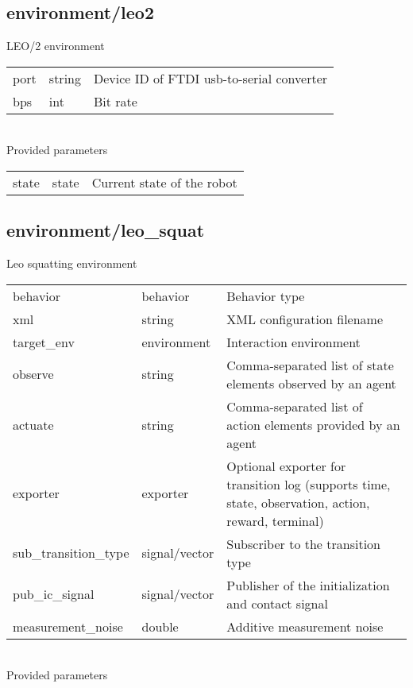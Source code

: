\subsection{environment/leo2}
\noindent LEO/2 environment\\

\noindent\begin{tabular}{@{}lll@{}}
port&string&Device ID of FTDI usb-to-serial converter\\
bps&int&Bit rate\\
\end{tabular}
\\

\noindent Provided parameters\\

\noindent\begin{tabular}{@{}lll@{}}
state&state&Current state of the robot\\
\end{tabular}
\subsection{environment/leo\_squat}
\noindent Leo squatting environment\\

\noindent\begin{tabular}{@{}lll@{}}
behavior&behavior&Behavior type\\
xml&string&XML configuration filename\\
target\_env&environment&Interaction environment\\
observe&string&Comma-separated list of state elements observed by an agent\\
actuate&string&Comma-separated list of action elements provided by an agent\\
exporter&exporter&Optional exporter for transition log (supports time, state, observation, action, reward, terminal)\\
sub\_transition\_type&signal/vector&Subscriber to the transition type\\
pub\_ic\_signal&signal/vector&Publisher of the initialization and contact signal\\
measurement\_noise&double&Additive measurement noise\\
\end{tabular}
\\

\noindent Provided parameters\\

